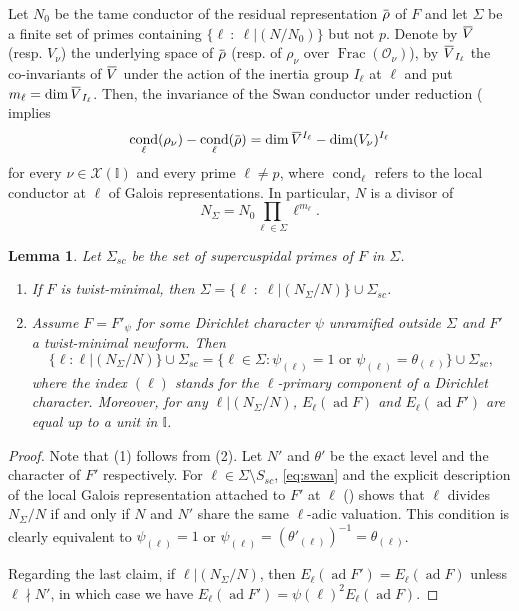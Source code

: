 \documentclass[12pt]{amsart}
\newcommand\bI{\mathbb{I}}
\newcommand\cO{\mathcal{O}}
\newcommand\cX{\mathcal{X}}
\newcommand{\ob}[1]{\mkern 1.5mu\overline{\mkern-1.5mu#1\mkern-1.5mu}\mkern 1.5mu}
\DeclareMathOperator{\Frac}{Frac}
\DeclareMathOperator{\ad}{ad}
\DeclareMathOperator{\cond}{cond}
\theoremstyle{defstyle}
\theoremstyle{thmstyle}
\newtheorem{lemma}[subsubsection]{Lemma}
\begin{document}
Let $N_0$ be the tame conductor of the residual representation $\ob{\rho}$ of $F$ and let $\Sigma$ be a finite set of primes containing $\{\ell \ \colon\ \ell|(N/N_0)\}$ but not $p$. Denote by $\ob{V}$ (resp. $V_\nu$) the underlying space of $\ob{\rho}$ (resp. of $\rho_\nu$ over $\Frac(\cO_\nu)$), by $\ob{V}_{I_\ell}$ the co-invariants of $\ob{V}$ under the action of the inertia group $I_\ell$ at $\ell$ and put $m_\ell=\dim \ob{V}_{I_\ell}$. Then, the invariance of the Swan conductor under reduction (\cite[\S1]{livne} implies
\begin{equation}\label{eq:swan}
	\cond_\ell(\rho_{\nu})-\cond_\ell(\ob{\rho})=\dim \ob{V}^{I_\ell}-\dim (V_{\nu})^{I_\ell}
\end{equation}
for every $\nu\in\cX(\bI)$ and every prime $\ell\neq p$, where $\cond_\ell$ refers to the local conductor at $\ell$ of Galois representations.
 In particular, $N$ is a divisor of 
\begin{equation}\label{eq:definition_N_Sigma}
	N_\Sigma=N_0\prod_{\ell\in\Sigma} \ell^{m_\ell}.
\end{equation}
\begin{lemma}\label{lem:partition_bad_primes_N_Sigma}
	Let $\Sigma_{sc}$ be the set of supercuspidal primes of $F$ in $\Sigma$.
	 \begin{enumerate}
	 	\item If $F$ is twist-minimal, then $\Sigma=\{\ell \; \colon \; \ell|(N_\Sigma/N)\} \cup \Sigma_{sc}$.
	 	\item Assume $F=F'_\psi$ for some Dirichlet character $\psi$ unramified outside $\Sigma$ and $F'$ a twist-minimal newform. Then  
	 	\[\{\ell \colon \ell|(N_\Sigma/N)\} \cup \Sigma_{sc}=\{\ell\in\Sigma \colon \psi_{(\ell)}=1 \mbox{ or } \psi_{(\ell)}=\theta_{(\ell)} \}\cup \Sigma_{sc}, \]
	 	where the index $(\ell)$ stands for the $\ell$-primary component of a Dirichlet character. Moreover, for any $\ell|(N_\Sigma/N)$, $E_\ell(\ad F)$ and $E_\ell(\ad F')$ are equal up to a unit in $\bI$.
	 \end{enumerate}
\end{lemma}
\begin{proof}
	Note that (1) follows from (2). Let $N'$ and $\theta'$ be the exact level and the character of $F'$ respectively. For $\ell\in\Sigma\setminus S_{sc}$,  \eqref{eq:swan} and the explicit description of the local Galois representation attached to $F'$ at $\ell$ (\cite[Lem. 6.3]{dimitrov2014local}) shows that $\ell$ divides $N_\Sigma/N$ if and only if $N$ and $N'$ share the same $\ell$-adic valuation. This condition is clearly equivalent to $\psi_{(\ell)}=1$ or $\psi_{(\ell)}=(\theta'_{(\ell)})^{-1}=\theta_{(\ell)}$. 
	
	Regarding the last claim, if $\ell|(N_\Sigma/N)$, then $E_\ell(\ad F')=E_\ell(\ad F)$ unless $\ell\nmid N'$, in which case we have $E_\ell(\ad F')=\psi(\ell)^2E_\ell(\ad F)$.
\end{proof}
\end{document}
